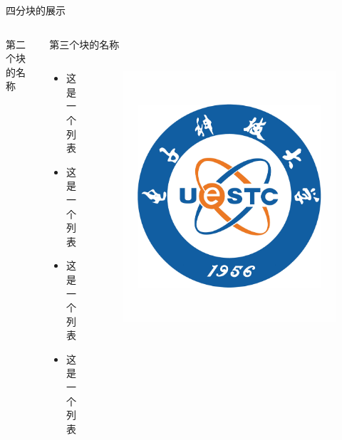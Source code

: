 \documentclass[aspectratio=169]{beamer}
\begin{document}
\begin{frame}{四分块的展示}
\begin{columns}[t]
\begin{column}{0.5\textwidth}
\begin{block}{\scriptsize 第二个块的名称}
\begin{center}
                \end{center}
            \end{block}
        \end{column}
        \begin{column}{0.5\textwidth}
            \begin{block}{\scriptsize 第三个块的名称}
                \begin{columns} %
                    \begin{column}{0.4\textwidth}
                        \begin{itemize}
                            \item 这是一个列表
                            \item 这是一个列表
                            \item 这是一个列表
                            \item 这是一个列表
                        \end{itemize}
                    \end{column}
                    \hspace{-3em}
                    \begin{column}{0.5\textwidth}
                        \vspace{-1.5em}
                        \begin{figure}
                            \centering
                            \includegraphics[width=\textwidth]{logo.pdf}

\end{figure}
\end{column}
\end{columns}
\end{block}
\end{column}
\end{columns}
\end{frame}
\end{document}
